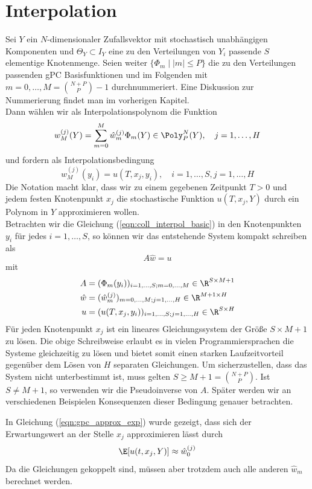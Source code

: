 \section{Interpolation}
Sei $Y$ ein $N$-dimensionaler Zufallsvektor mit stochastisch unabhängigen Komponenten und $\Theta_Y\subset I_Y$ eine zu den Verteilungen von $Y_i$ passende $S$ elementige Knotenmenge. Seien weiter $\lbrace \Phi_m \mid |m|\le P \rbrace$ die zu den Verteilungen passenden gPC Basisfunktionen und im Folgenden mit $m=0,\dots,M=\binom{N+P}{P}-1$ durchnummeriert. Eine Diskussion zur Nummerierung findet man im vorherigen Kapitel.\\
Dann wählen wir als Interpolationspolynom die Funktion
\begin{equation}
\label{eqn:coll_interpol_basic}
w_M^{(j)}(Y)=\sum_{m=0}^M\hat{w}_m^{(j)}\Phi_m(Y)\in\Poly_P^N(Y),\quad j=1,\dots,H
\end{equation}
und fordern als Interpolationsbedingung
\[w_M^{(j)}(y_i)=u(T,x_j,y_i),\quad i=1,\dots,S, j=1,\dots,H\]
Die Notation macht klar, dass wir zu einem gegebenen Zeitpunkt $T>0$ und jedem festen Knotenpunkt $x_j$ die stochastische Funktion $u(T,x_j,Y)$ durch ein Polynom in $Y$ approximieren wollen.\\
Betrachten wir die Gleichung (\ref{eqn:coll_interpol_basic}) in den Knotenpunkten $y_i$ für jedes $i=1,\dots,S$, so können wir das entstehende System kompakt schreiben als
\begin{equation}
\label{eqn:interpol_compact}
A\hat{w}=u
\end{equation}
mit 
\begin{align*}
A&=(\Phi_m(y_i))_{i=1,\dots,S;m=0,\dots,M}\in\R^{S\times M+1}\\
\hat{w}&=(\hat{w}_m^{(j)})_{m=0,\dots,M;j=1,\dots,H}\in\R^{M+1\times H}\\
u&=(u(T,x_j,y_i))_{i=1,\dots,S;j=1,\dots,H}\in\R^{S\times H}\\
\end{align*}
Für jeden Knotenpunkt $x_j$ ist ein lineares Gleichungssystem der Größe $S\times M+1$ zu lösen. Die obige Schreibweise erlaubt es in vielen Programmiersprachen die Systeme gleichzeitig zu lösen und bietet somit einen starken Laufzeitvorteil gegenüber dem Lösen von $H$ separaten Gleichungen. Um sicherzustellen, dass das System nicht unterbestimmt ist, muss gelten $S\ge M+1=\binom{N+P}{P}$. Ist $S\neq M+1$, so verwenden wir die Pseudoinverse von $A$. Später werden wir an verschiedenen Beispielen Konsequenzen dieser Bedingung genauer betrachten.
\begin{mathbem}
In Gleichung (\ref{eqn:gpc_approx_exp}) wurde gezeigt, dass sich der Erwartungswert an der Stelle $x_j$ approximieren lässt durch
\[\E[u(t,x_j,Y)]\approx \hat{w}_0^{(j)}\]
Da die Gleichungen gekoppelt sind, müssen aber trotzdem auch alle anderen $\hat{w}_m$ berechnet werden.
\end{mathbem}

